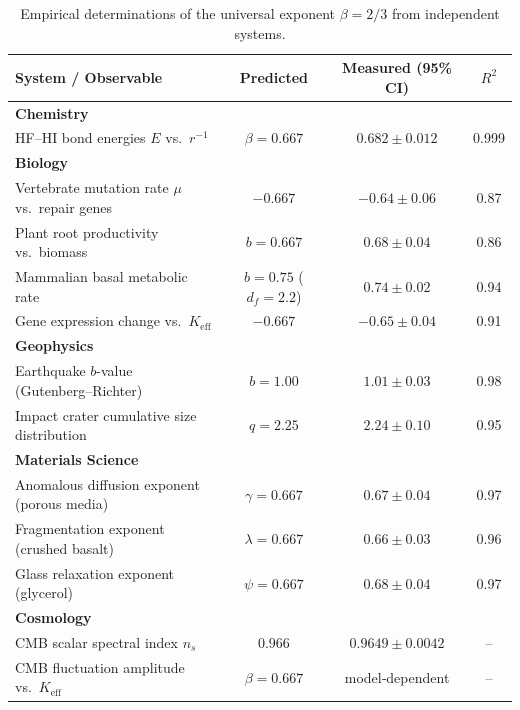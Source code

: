 \documentclass[12pt,a4paper]{article}
\begin{document}
	\begin{otherlanguage}{english}
		\begin{table}[H]
			\centering
			\caption{Empirical determinations of the universal exponent \(\beta = 2/3\) from independent systems.}
			\label{tab:empirical-beta}
			\small
			\begin{tabular}{lccc}
				\toprule
				\textbf{System / Observable} & \textbf{Predicted} & \textbf{Measured (95\% CI)} & \(R^2\) \\
				\midrule
				\textbf{Chemistry} & & & \\
				\quad HF–HI bond energies \(E\) vs.\ \(r^{-1}\) & \(\beta = 0.667\) & \(0.682 \pm 0.012\) & 0.999 \\
				\textbf{Biology} & & & \\
				\quad Vertebrate mutation rate \(\mu\) vs.\ repair genes & \(-0.667\) & \(-0.64 \pm 0.06\) & 0.87 \\
				\quad Plant root productivity vs.\ biomass & \(b = 0.667\) & \(0.68 \pm 0.04\) & 0.86 \\
				\quad Mammalian basal metabolic rate & \(b = 0.75\) (\(d_f=2.2\)) & \(0.74 \pm 0.02\) & 0.94 \\
				\quad Gene expression change vs.\ \(K_{\mathrm{eff}}\) & \(-0.667\) & \(-0.65 \pm 0.04\) & 0.91 \\
				\textbf{Geophysics} & & & \\
				\quad Earthquake \(b\)-value (Gutenberg–Richter) & \(b = 1.00\) & \(1.01 \pm 0.03\) & 0.98 \\
				\quad Impact crater cumulative size distribution & \(q = 2.25\) & \(2.24 \pm 0.10\) & 0.95 \\
				\textbf{Materials Science} & & & \\
				\quad Anomalous diffusion exponent (porous media) & \(\gamma = 0.667\) & \(0.67 \pm 0.04\) & 0.97 \\
				\quad Fragmentation exponent (crushed basalt) & \(\lambda = 0.667\) & \(0.66 \pm 0.03\) & 0.96 \\
				\quad Glass relaxation exponent (glycerol) & \(\psi = 0.667\) & \(0.68 \pm 0.04\) & 0.97 \\
				\textbf{Cosmology} & & & \\
				\quad CMB scalar spectral index \(n_s\) & \(0.966\) & \(0.9649 \pm 0.0042\) & -- \\
				\quad CMB fluctuation amplitude vs.\ \(K_{\mathrm{eff}}\) & \(\beta = 0.667\) & model‑dependent & -- \\
				\bottomrule
			\end{tabular}
		\end{table}
	\end{otherlanguage}
	
\end{document}
